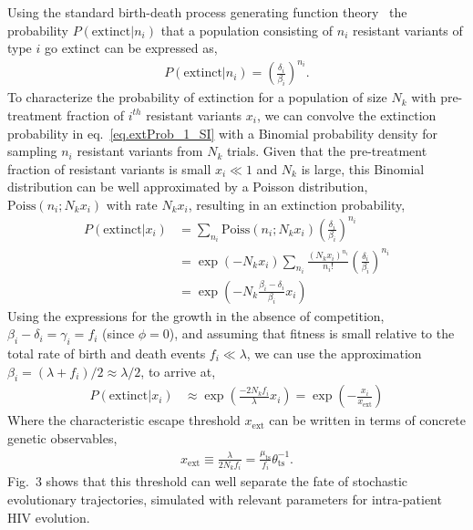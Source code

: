 \documentclass[11pt]{article}
\newcommand{\ext}{{\text{ext}}}
\newcommand{\ts}{{\text{ts}}}
\begin{document}
Using the standard birth-death process generating function theory~\cite{allenIntroductionStochasticProcesses2010} the probability $P(\text{extinct}|n_i) $ that a population consisting of  $n_i$ resistant variants of type $i$ go extinct can be expressed as, 
\begin{align}
P(\text{extinct}|n_i) = \left( \frac{\delta_i}{\beta_i} \right)^{n_i}.\label{eq.extProb_1_SI}
\end{align}
To characterize the probability of extinction for a population of  size $N_k$ with pre-treatment fraction of $i^{th}$ resistant variants $x_i$, we can convolve the extinction probability in eq.~\ref{eq.extProb_1_SI} with a Binomial probability density for sampling $n_i$ resistant variants from  $N_k$ trials. Given that the pre-treatment fraction of resistant variants  is small $x_i\ll 1$ and $N_k$ is large, this Binomial distribution can be well approximated by a Poisson distribution, $\text{Poiss}(n_i; N_kx_i)$ with rate $N_k x_i$, resulting in an extinction probability,
\begin{align}
\nonumber P(\text{extinct}|x_i) &= \sum_{n_i} \text{Poiss}(n_i; N_kx_i)\left( \frac{\delta_i}{\beta_i} \right)^{n_i} \\
\nonumber	&=  \exp(-N_k x_i) \sum_{n_i} \frac{(N_k x_i)^{n_i}}{n_i !}  \left( \frac{\delta_i}{\beta_i} \right)^{n_i} \\
	&= \exp \left( -N_k \frac{\beta_i - \delta_i}{\beta_i} x_i \right)
\end{align}
Using the expressions for the growth in the absence of competition, $\beta_i - \delta_i = \gamma_i = f_i$ (since $\phi = 0$), and assuming that fitness  is small relative to the total rate of birth and death events $f_i\ll \lambda$, we can use the approximation $\beta_i  = (\lambda + f_i) /2 \approx \lambda/2$, to arrive at,
\begin{align}
P(\text{extinct}|x_i) 
	& \approx \exp\left( \frac{-2 N_k f_i}{\lambda} x_i  \right) = \exp \left( - \frac{x_i}{x_\ext} \right) \label{eq:extinctprob}
\end{align}
Where the characteristic escape threshold $x_\ext$ can be written in terms of concrete genetic observables,
\begin{align}
x_\ext \equiv  \frac{\lambda}{ 2 N_k f_i}  = \frac{\mu_{\ts}}{f_i} \theta_{\ts}^{-1}.
\label{eq.xesc_SI}
\end{align}
Fig.~3 shows that this threshold can well separate the fate of stochastic  evolutionary trajectories, simulated with relevant parameters for intra-patient HIV evolution.
\end{document}
